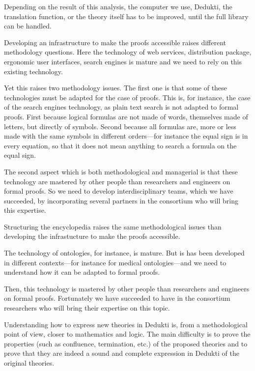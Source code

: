Depending on the result of this analysis, the computer we use, Dedukti,
the translation function, or the theory itself has to be improved, until
the full library can be handled.


Developing an infrastructure to make the proofs accessible raises
different methodology questions. Here the technology of web services,
distribution package, ergonomic user interfaces, search engines is
mature and we need to rely on this existing technology.

Yet this raises two methodology issues. The first one is that some of
these technologies must be adapted for the case of proofs. This is,
for instance, the case of the search engines technology, as plain text
search is not adapted to formal proofs. First because logical formulas
are not made of words, themselves made of letters, but directly of
symbols. Second because all formulas are, more or less made with the
same symbols in different orders---for instance the equal sign is in
every equation, so that it does not mean anything to search a formula
on the equal sign.

The second aspect which is both methodological and managerial is that
these technology are mastered by other people than researchers and
engineers on formal proofs. So we need to develop interdisciplinary
teams, which we have succeeded, by incorporating several partners
in the consortium who will bring this expertise.


Structuring the encyclopedia raises the same methodological issues
than developing the infrastucture to make the proofs accessible.

The technology of ontologies, for instance, is mature. But is has been
developed in different contexts---for instance for medical
ontologies---and we need to understand how it can be adapted to formal
proofs. 

Then, this technology is mastered by other people than researchers and
engineers on formal proofs. Fortunately we have succeeded to have in
the consortium researchers who will bring their expertise on this
topic.


Understanding how to express new theories in Dedukti is, from a
methodological point of view, closer to mathematics and logic.  The
main difficulty is to prove the properties (such as confluence,
termination, etc.) of the proposed theories and to prove that they are
indeed a sound and complete expression in Dedukti of the original
theories.

